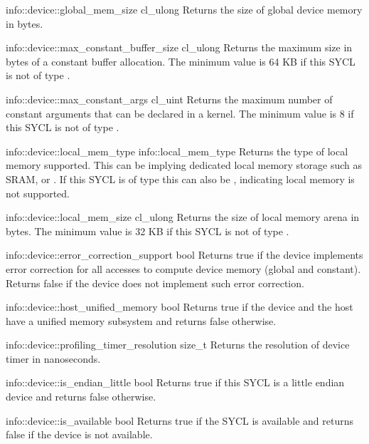  \addInfoRow
  {info::device::global_mem_size}
  {cl_ulong}
  {Returns the size of global device memory in bytes.}

  \addInfoRow
  {info::device::max_constant_buffer_size}
  {cl_ulong}
  {
  Returns the maximum size in bytes of a constant buffer allocation. The minimum value is 64 KB if this SYCL  is not of type .
  }

  \addInfoRow
  {info::device::max_constant_args}
  {cl_uint}
  {
  Returns the maximum number of constant arguments that can be declared in a kernel. The minimum value is 8 if this SYCL  is not of type .
  }

  \addInfoRow
  {info::device::local_mem_type}
  {info::local_mem_type}
  {
   Returns the type of local memory supported. This can
  be  implying dedicated
  local memory storage such as SRAM, or .
  If this SYCL  is of type  this can also be , indicating local memory is not supported.
  }

  \addInfoRow
  {info::device::local_mem_size}
  {cl_ulong}
  {
  Returns the size of local memory arena in bytes. The minimum value is 32 KB if this SYCL  is not of type .
  }

  \addInfoRow
  {info::device::error_correction_support}
  {bool}
  {
   Returns true if the device implements error correction for all accesses to
  compute device memory (global and constant). Returns false if the device does
  not implement such error correction.
  }

  \addInfoRow
  {info::device::host_unified_memory}
  {bool}
  {
   Returns true if the device and the host have a unified memory subsystem and
  returns false otherwise.
  }

  \addInfoRow
  {info::device::profiling_timer_resolution}
  {size_t}
  {
  Returns the resolution of device timer in nanoseconds.
  }

  \addInfoRow
  {info::device::is_endian_little}
  {bool}
  {
  Returns true if this SYCL  is a little endian device and returns false otherwise.
  }

  \addInfoRow
  {info::device::is_available}
  {bool}
  {
  Returns true if the SYCL  is available and returns false if the device is not
  available.
  }

